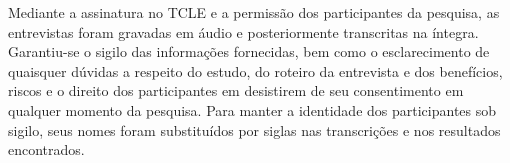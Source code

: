 Mediante a assinatura no \acrshort{TCLE} e a permissão dos participantes da pesquisa, as entrevistas foram gravadas em áudio e posteriormente transcritas na íntegra. Garantiu-se o sigilo das informações fornecidas, bem como o esclarecimento de quaisquer dúvidas a respeito do estudo, do roteiro da entrevista e dos benefícios, riscos e o direito dos participantes em desistirem de seu consentimento em qualquer momento da pesquisa. Para manter a identidade dos participantes sob sigilo, seus nomes foram substituídos por siglas nas transcrições e nos resultados encontrados.
